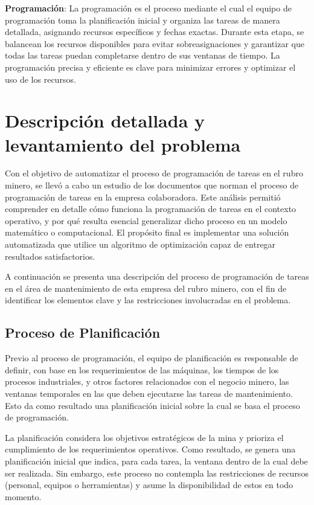 \documentclass{article}
\begin{document}
\textbf{Programación}: La programación es el proceso mediante el cual el equipo de programación toma la planificación inicial y organiza las tareas de manera detallada, asignando recursos específicos y fechas exactas. Durante esta etapa, se balancean los recursos disponibles para evitar sobreasignaciones y garantizar que todas las tareas puedan completarse dentro de sus ventanas de tiempo. La programación precisa y eficiente es clave para minimizar errores y optimizar el uso de los recursos.

\section{Descripción detallada y levantamiento del problema}
Con el objetivo de automatizar el proceso de programación de tareas en el rubro minero, se llevó a cabo un estudio de los documentos que norman el proceso de programación de tareas en la empresa colaboradora. Este análisis permitió comprender en detalle cómo funciona la programación de tareas en el contexto operativo, y por qué resulta esencial generalizar dicho proceso en un modelo matemático o computacional. El propósito final es implementar una solución automatizada que utilice un algoritmo de optimización capaz de entregar resultados satisfactorios.

A continuación se presenta una descripción del proceso de programación de tareas en el área de mantenimiento de esta empresa del rubro minero, con el fin de identificar los elementos clave y las restricciones involucradas en el problema.


\subsection{Proceso de Planificación}

Previo al proceso de programación, el equipo de planificación es responsable de definir, con base en los requerimientos de las máquinas, los tiempos de los procesos industriales, y otros factores relacionados con el negocio minero, las ventanas temporales en las que deben ejecutarse las tareas de mantenimiento. Esto da como resultado una planificación inicial sobre la cual se basa el proceso de programación.

La planificación considera los objetivos estratégicos de la mina y prioriza el cumplimiento de los requerimientos operativos. Como resultado, se genera una planificación inicial que indica, para cada tarea, la ventana dentro de la cual debe ser realizada. Sin embargo, este proceso no contempla las restricciones de recursos (personal, equipos o herramientas) y asume la disponibilidad de estos en todo momento.
\end{document}

